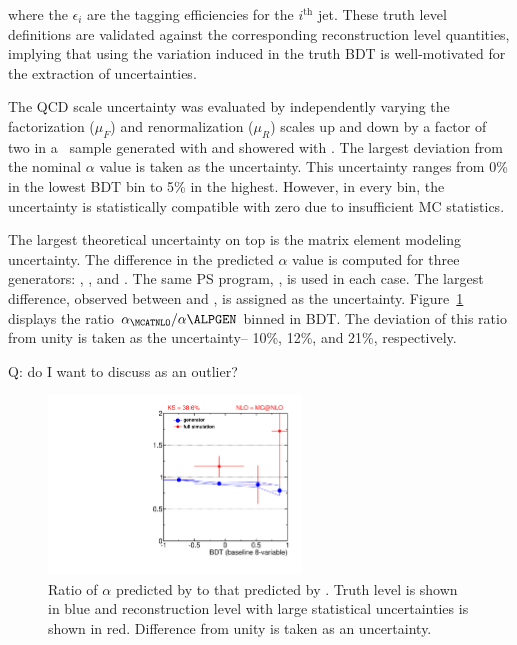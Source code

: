 \noindent where the $\epsilon_i$ are the tagging efficiencies for the
$i^{\textrm{th}}$ jet. These truth level definitions are validated
against the corresponding reconstruction level quantities, implying
that using the variation induced in the truth BDT is well-motivated for
the extraction of uncertainties. 

The QCD scale uncertainty was evaluated by independently varying the factorization
($\mu_F$) and renormalization ($\mu_R$) scales up and down by a factor
of two in a \ttbar~sample generated with \MCATNLO and showered
with \HERWIG. The largest deviation from the nominal $\alpha$ value is
taken as the uncertainty. This uncertainty ranges from 0\% in the
lowest BDT bin to 5\% in the highest. However, in every bin, the
uncertainty is statistically compatible with zero due to insufficient
MC statistics. 

The largest theoretical uncertainty on top is the matrix element
modeling uncertainty. The difference in the predicted $\alpha$ value
is computed for three generators: \MCATNLO, \POWHEG, and \ALPGEN. The
same PS program, \HERWIG, is used in each case. The largest difference,
observed between \MCATNLO and \ALPGEN, is assigned as the
uncertainty. Figure~\ref{chap:analysis:fig:alpha_ratio} displays the
ratio $\alpha_{\MCATNLO}/\alpha{\ALPGEN}$ binned in BDT. The deviation
of this ratio from unity is taken as the uncertainty-- 10\%, 12\%, and
21\%, respectively. 

Q: do I want to discuss \MCATNLO as an outlier?

\begin{figure}[h]
  \centering
  \includegraphics[width=0.6\textwidth]{fig/analysis/ttbar_sys_cjv_mcatnlo03.pdf}
   \caption{Ratio of $\alpha$ predicted by \ALPGEN to that predicted
  by \MCATNLO. Truth level is shown in blue and reconstruction level
  with large statistical uncertainties is shown in red. Difference
  from unity is taken as an uncertainty.}
  \label{chap:analysis:fig:alpha_ratio}
\end{figure}


